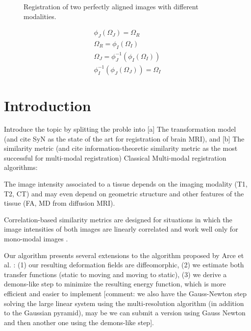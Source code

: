 \begin{figure}[H]
\caption{Registration of two perfectly aligned images with different modalities.}
\label{fig:brainweb_t1_t2}
\end{figure}

\begin{align}
    \phi_{J}(\Omega_{J}) = \Omega_{R}\\
    \Omega_{R} = \phi_{I}(\Omega_{I})\\
    \Omega_{J} = \phi_{J}^{-1}(\phi_{I}(\Omega_{I}))\\
    \phi_{I}^{-1}(\phi_{J}(\Omega_{J})) = \Omega_{I}
\end{align}


\section{Introduction}
Introduce the topic by splitting the proble into [a] The transformation model (and cite SyN as the state of the art for registration of brain MRI), and [b] The similarity metric (and cite information-theoretic similarity metric as the most successful for multi-modal registration)
Classical Multi-modal registration algorithms: \cite{Wells1996}\cite{Maes1997}

The image intensity associated to a tissue depends on the imaging modality (T1, T2, CT) and may even depend on geometric structure and other features of the tissue (FA, MD from diffusion MRI).


Correlation-based similarity metrics are designed for situations in which the image intensities of both images are linearly correlated and work well only for mono-modal images \cite{Roche2004}.

Our algorithm presents several extensions to the algorithm proposed by Arce et al. \cite{Arce-santana2014}: (1) our resulting deformation fields are diffeomorphic, (2) we estimate both transfer functions (static to moving and moving to static), (3) we derive a demons-like step to minimize the resulting energy function, which is more efficient and easier to implement [comment: we also have the Gauss-Newton step solving the large linear system using the multi-resolution algorithm (in addition to the Gaussian pyramid), may be we can submit a version using Gauss Newton and then another one using the demons-like step].

